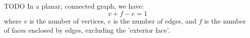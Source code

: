 \documentclass[main.tex]{subfiles}
\begin{document}
\begin{corollary}
TODO In a planar, connected graph, we have:
$$v + f - e = 1$$
where $v$ is the number of vertices, $e$ is the number of edges, and $f$ is the number of faces enclosed by edges, excluding the 'exterior face'.
\end{corollary}

\end{document}
